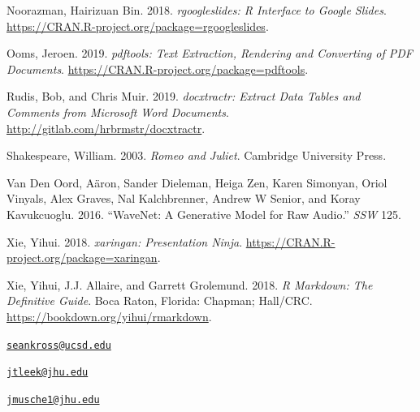 \leavevmode\hypertarget{ref-rgoogleslides}{}%
Noorazman, Hairizuan Bin. 2018. \emph{rgoogleslides: R Interface to
Google Slides}. \url{https://CRAN.R-project.org/package=rgoogleslides}.

\leavevmode\hypertarget{ref-pdftools}{}%
Ooms, Jeroen. 2019. \emph{pdftools: Text Extraction, Rendering and
Converting of PDF Documents}.
\url{https://CRAN.R-project.org/package=pdftools}.

\leavevmode\hypertarget{ref-docxtractr}{}%
Rudis, Bob, and Chris Muir. 2019. \emph{docxtractr: Extract Data Tables
and Comments from Microsoft Word Documents}.
\url{http://gitlab.com/hrbrmstr/docxtractr}.

\leavevmode\hypertarget{ref-shakespeare2003romeo}{}%
Shakespeare, William. 2003. \emph{Romeo and Juliet}. Cambridge
University Press.

\leavevmode\hypertarget{ref-van2016wavenet}{}%
Van Den Oord, Aäron, Sander Dieleman, Heiga Zen, Karen Simonyan, Oriol
Vinyals, Alex Graves, Nal Kalchbrenner, Andrew W Senior, and Koray
Kavukcuoglu. 2016. ``WaveNet: A Generative Model for Raw Audio.''
\emph{SSW} 125.

\leavevmode\hypertarget{ref-xaringan}{}%
Xie, Yihui. 2018. \emph{xaringan: Presentation Ninja}.
\url{https://CRAN.R-project.org/package=xaringan}.

\leavevmode\hypertarget{ref-rmarkdownbook}{}%
Xie, Yihui, J.J. Allaire, and Garrett Grolemund. 2018. \emph{R Markdown:
The Definitive Guide}. Boca Raton, Florida: Chapman; Hall/CRC.
\url{https://bookdown.org/yihui/rmarkdown}.



\address{%
Sean Kross\\
Department of Cognitive Science, University of California, San Diego\\
9500 Gilman Dr.\\ La Jolla, CA 92093\\
}
\href{mailto:seankross@ucsd.edu}{\nolinkurl{seankross@ucsd.edu}}

\address{%
Jeffrey T. Leek\\
Department of Biostatistics, Johns Hopkins Bloomberg School of Public
Health\\
615 N Wolfe Street\\ Baltimore, MD 21231\\
}
\href{mailto:jtleek@jhu.edu}{\nolinkurl{jtleek@jhu.edu}}

\address{%
John Muschelli\\
Department of Biostatistics, Johns Hopkins Bloomberg School of Public
Health\\
615 N Wolfe Street\\ Baltimore, MD 21231\\
}
\href{mailto:jmusche1@jhu.edu}{\nolinkurl{jmusche1@jhu.edu}}

